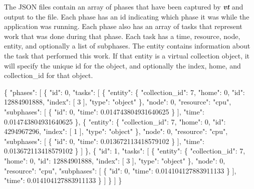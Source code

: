 The J\+S\+ON files contain an array of {\ttfamily phases} that have been captured by {\bfseries {\itshape vt}} and output to the file. Each phase has an {\ttfamily id} indicating which phase it was while the application was running. Each phase also has an array of {\ttfamily tasks} that represent work that was done during that phase. Each task has a {\ttfamily time}, {\ttfamily resource}, {\ttfamily node}, {\ttfamily entity}, and optionally a list of {\ttfamily subphases}. The {\ttfamily entity} contains information about the task that performed this work. If that {\ttfamily entity} is a virtual collection object, it will specify the unique {\ttfamily id} for the object, and optionally the {\ttfamily index}, {\ttfamily home}, and {\ttfamily collection\+\_\+id} for that object.


\begin{DoxyCode}
\{
    "phases": [
        \{
            "id": 0,
            "tasks": [
                \{
                    "entity": \{
                        "collection\_id": 7,
                        "home": 0,
                        "id": 12884901888,
                        "index": [
                            3
                        ],
                        "type": "object"
                    \},
                    "node": 0,
                    "resource": "cpu",
                    "subphases": [
                        \{
                            "id": 0,
                            "time": 0.014743804931640625
                        \}
                    ],
                    "time": 0.014743804931640625
                \},
                \{
                    "entity": \{
                        "collection\_id": 7,
                        "home": 0,
                        "id": 4294967296,
                        "index": [
                            1
                        ],
                        "type": "object"
                    \},
                    "node": 0,
                    "resource": "cpu",
                    "subphases": [
                        \{
                            "id": 0,
                            "time": 0.013672113418579102
                        \}
                    ],
                    "time": 0.013672113418579102
                \}
            ]
        \},
        \{
            "id": 1,
            "tasks": [
                \{
                    "entity": \{
                        "collection\_id": 7,
                        "home": 0,
                        "id": 12884901888,
                        "index": [
                            3
                        ],
                        "type": "object"
                    \},
                    "node": 0,
                    "resource": "cpu",
                    "subphases": [
                        \{
                            "id": 0,
                            "time": 0.014104127883911133
                        \}
                    ],
                    "time": 0.014104127883911133
                \}
            ]
        \}
    ]
\}
\end{DoxyCode}


